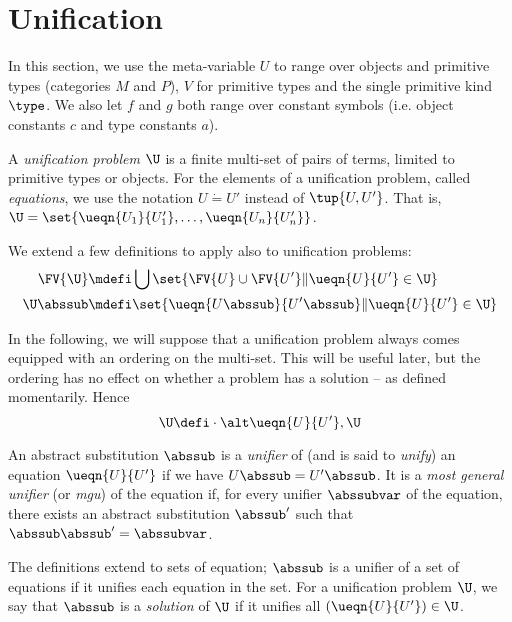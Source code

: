 \clearpage

\section*{Unification}

In this section, we use the meta-variable $U$ to range over objects and primitive types (categories $M$ and $P$), $V$ for primitive types and the single primitive kind $\type$.
We also let $f$ and $g$ both range over constant symbols (i.e. object constants $c$ and type constants $a$).

\begin{definition}
\label{def:unification-problem}
A \emph{unification problem} $\U$ is a finite multi-set of pairs of terms, limited to primitive types or objects.
For the elements of a unification problem, called \emph{equations}, we use the notation $U \dot{=} U'$ instead of $\tup{U, U'}$.
That is, $\U = \set{\ueqn{U_1}{U_1'}, \ldots, \ueqn{U_n}{U_n'}}$.
\end{definition}


We extend a few definitions to apply also to unification problems:
\begin{align*}
\FV{\U} &\mdefi \bigcup{\set{\FV{U} \cup \FV{U'} \| \ueqn{U}{U'} \in \U}} \\
\U \abssub &\mdefi \set{\ueqn{U \abssub}{U' \abssub} \| \ueqn{U}{U'} \in \U}
\end{align*}

In the following, we will suppose that a unification problem always comes equipped with an ordering on the multi-set.
This will be useful later, but the ordering has no effect on whether a problem has a solution -- as defined momentarily.
Hence
\[ \U \defi \cdot \alt \ueqn{U}{U'}, \U \]

\begin{definition}
\label{def:unifier-mgu}
An abstract substitution $\abssub$ is a \emph{unifier} of (and is said to \emph{unify}) an equation $\ueqn{U}{U'}$ if we have $U \abssub = U' \abssub$.
It is a \emph{most general unifier} (or \emph{mgu}) of the equation if, for every unifier $\abssubvar$ of the equation, there exists an abstract substitution $\abssub'$ such that $\abssub \abssub' = \abssubvar$.

The definitions extend to sets of equation; $\abssub$ is a unifier of a set of equations if it unifies each equation in the set.
For a unification problem $\U$, we say that $\abssub$ is a \emph{solution} of $\U$ if it unifies all $(\ueqn{U}{U'}) \in \U$.
\end{definition}

